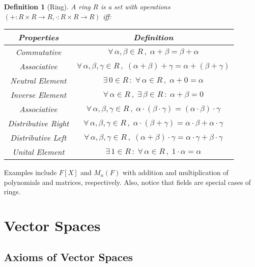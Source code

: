 \documentclass[12pt]{article}
\newcommand{\Forall}[1]{\forall\,{#1}\,,\;}
\newcommand{\Exist}[1]{\exists\,{#1}\,:\;}
\newtheorem{definition}{Definition}[subsection]
\begin{document}
\begin{definition}[Ring]
  A ring $R$ is a set with operations $(+:R\times R\to R,\cdot:R\times R\to R)$ iff:

  \begin{table}[H]
    \centering
    \begin{tabular}{|c|c|}\hline
      Properties & Definition \\\hline
      Commutative & $\Forall{\alpha,\beta\in R}\alpha+\beta=\beta+\alpha$ \\\hline
      Associative & $\Forall{\alpha,\beta,\gamma\in R} (\alpha+\beta)+\gamma=\alpha+(\beta+\gamma)$ \\\hline
      Neutral Element & $\Exist{0 \in R}\Forall{\alpha\in R} \alpha+0=\alpha$ \\\hline
      Inverse Element & $\Forall{\alpha\in R}\Exist{\beta \in R}\alpha+\beta=0$ \\\hline
      Associative & $\Forall{\alpha,\beta,\gamma \in R}\alpha\cdot(\beta\cdot \gamma)=(\alpha\cdot\beta)\cdot\gamma$ \\\hline
      Distributive Right & $\Forall{\alpha,\beta,\gamma\in R} \alpha\cdot(\beta+\gamma)=\alpha\cdot \beta+\alpha\cdot \gamma$ \\\hline
      Distributive Left & $\Forall{\alpha,\beta,\gamma\in R} (\alpha+\beta)\cdot \gamma=\alpha\cdot \gamma+\beta\cdot \gamma$ \\\hline
      Unital Element & $\Exist{1 \in R}\Forall{\alpha\in R} 1\cdot \alpha=\alpha$ \\\hline
    \end{tabular}
  \end{table}
\end{definition}

Examples include $F[X]$ and $M_n(F)$ with addition and multiplication of polynomials and matrices, respectively. Also, notice that fields are special cases of rings.

\pagebreak

\section{Vector Spaces}

\subsection{Axioms of Vector Spaces}
\end{document}
